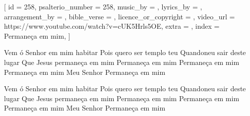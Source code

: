 
[
    id                     = {258},
    psalterio_number       = {258},
    music_by               = {},
    lyrics_by              = {},
    arrangement_by         = {},
    bible_verse            = {},
    licence_or_copyright   = {},
    video_url              = {https://www.youtube.com/watch?v=cUK5Hrls5OE},
    extra                  = {},
    index                  = {Permaneça em mim},
]


\beginverse

Vem ó Senhor em mim habitar
Pois quero ser templo teu
Quandoneu sair deste lugar
Que Jesus permaneça em mim
Permaneça em mim
Permaneça em mim
Permaneça em mim
Meu Senhor
Permaneça em mim

\endverse


\beginverse

Vem ó Senhor em mim habitar
Pois quero ser templo teu
Quandoneu sair deste lugar
Que Jesus permaneça em mim
Permaneça em mim
Permaneça em mim
Permaneça em mim
Meu Senhor
Permaneça em mim

\endverse


\endsong
